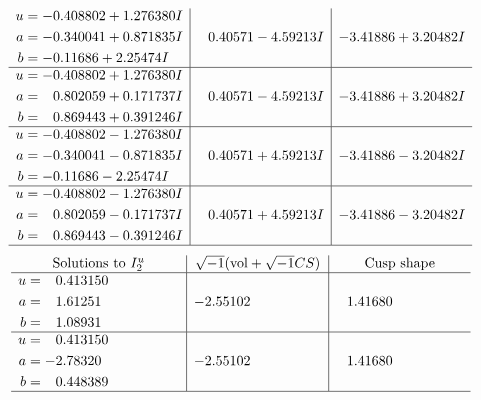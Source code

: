 \documentclass[1p]{elsarticle_modified}
\theoremstyle{definition}
\newcommand{\I}{\sqrt{-1}}
\begin{document}
$$\begin{array}{c|c|c}
\begin{aligned}
u &= -0.408802 + 1.276380 I \\
a &= -0.340041 + 0.871835 I \\
b &= -0.11686 + 2.25474 I\end{aligned}
 & \phantom{-}0.40571 - 4.59213 I & -3.41886 + 3.20482 I \\ \hline\begin{aligned}
u &= -0.408802 + 1.276380 I \\
a &= \phantom{-}0.802059 + 0.171737 I \\
b &= \phantom{-}0.869443 + 0.391246 I\end{aligned}
 & \phantom{-}0.40571 - 4.59213 I & -3.41886 + 3.20482 I \\ \hline\begin{aligned}
u &= -0.408802 - 1.276380 I \\
a &= -0.340041 - 0.871835 I \\
b &= -0.11686 - 2.25474 I\end{aligned}
 & \phantom{-}0.40571 + 4.59213 I & -3.41886 - 3.20482 I \\ \hline\begin{aligned}
u &= -0.408802 - 1.276380 I \\
a &= \phantom{-}0.802059 - 0.171737 I \\
b &= \phantom{-}0.869443 - 0.391246 I\end{aligned}
 & \phantom{-}0.40571 + 4.59213 I & -3.41886 - 3.20482 I\\
 \hline 
 \end{array}$$\newpage$$\begin{array}{c|c|c}  
\text{Solutions to }I^u_{2}& \I (\text{vol} + \sqrt{-1}CS) & \text{Cusp shape}\\
 \hline 
\begin{aligned}
u &= \phantom{-}0.413150\phantom{ +0.000000I} \\
a &= \phantom{-}1.61251\phantom{ +0.000000I} \\
b &= \phantom{-}1.08931\phantom{ +0.000000I}\end{aligned}
 & -2.55102\phantom{ +0.000000I} & \phantom{-}1.41680\phantom{ +0.000000I} \\ \hline\begin{aligned}
u &= \phantom{-}0.413150\phantom{ +0.000000I} \\
a &= -2.78320\phantom{ +0.000000I} \\
b &= \phantom{-}0.448389\phantom{ +0.000000I}\end{aligned}
 & -2.55102\phantom{ +0.000000I} & \phantom{-}1.41680\phantom{ +0.000000I}\\
 \hline 
 \end{array}$$\newpage\newpage\renewcommand{\arraystretch}{1}
\end{document}
